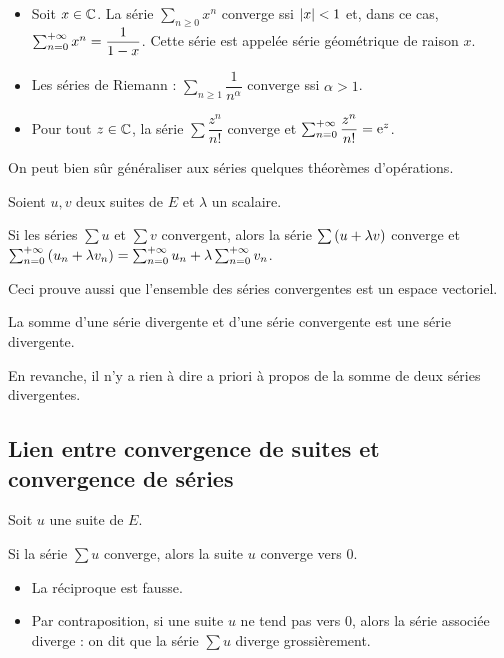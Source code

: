 \begin{ex}
\begin{itemize}
    \item Soit \(x\in\mathbb{C}\). La série \(\sum_{n\geq0}x^n\) converge ssi \(\left\lvert x\right\rvert<1\) et, dans ce cas, \(\sum_{n=0}^{+\infty}x^n=\dfrac{1}{1-x}\). Cette série est appelée série géométrique de raison \(x\). \\
    \item Les séries de Riemann : \(\sum_{n\geq1}\dfrac{1}{n^\alpha}\) converge ssi \(\alpha>1\). \\
    \item Pour tout \(z\in\mathbb{C}\), la série \(\sum\dfrac{z^n}{n!}\) converge et \(\sum_{n=0}^{+\infty}\dfrac{z^n}{n!}=\mathrm{e}^{z}\).
\end{itemize}
\end{ex}

On peut bien sûr généraliser aux séries quelques théorèmes d'opérations.

\begin{prop}
Soient \(u,v\) deux suites de \(E\) et \(\lambda\) un scalaire.

Si les séries \(\sum u\) et \(\sum v\) convergent, alors la série \(\sum\left(u+\lambda v\right)\) converge et \(\sum_{n=0}^{+\infty}\left(u_n+\lambda v_n\right)=\sum_{n=0}^{+\infty}u_n+\lambda\sum_{n=0}^{+\infty}v_n\).

Ceci prouve aussi que l'ensemble des séries convergentes est un espace vectoriel.
\end{prop}

\begin{rem}
La somme d'une série divergente et d'une série convergente est une série divergente.

En revanche, il n'y a rien à dire a priori à propos de la somme de deux séries divergentes.
\end{rem}

\subsection{Lien entre convergence de suites et convergence de séries}

\begin{prop}
Soit \(u\) une suite de \(E\).

Si la série \(\sum u\) converge, alors la suite \(u\) converge vers \(0\).
\end{prop}

\begin{rem}
\begin{itemize}
    \item La réciproque est fausse. \\
    \item Par contraposition, si une suite \(u\) ne tend pas vers \(0\), alors la série associée diverge : on dit que la série \(\sum u\) diverge grossièrement.
\end{itemize}
\end{rem}

